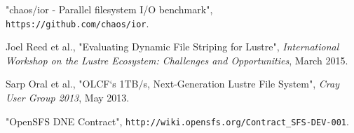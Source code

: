 \documentclass[conference,compsoc]{IEEEtran}
\begin{document}


%
%
%
\begin{thebibliography}{1}


"chaos/ior - Parallel filesystem I/O benchmark", \texttt{https://github.com/chaos/ior}.

Joel Reed et al., "Evaluating Dynamic File Striping for Lustre", \emph{International Workshop on the Lustre Ecosystem: Challenges and Opportunities}, March 2015.

Sarp Oral et al., "OLCF`s 1TB$/$s, Next-Generation Lustre File System", \emph{Cray User Group 2013}, May 2013.

"OpenSFS DNE Contract", \texttt{http://wiki.opensfs.org/Contract\_SFS-DEV-001}.

\end{thebibliography}


\end{document}
